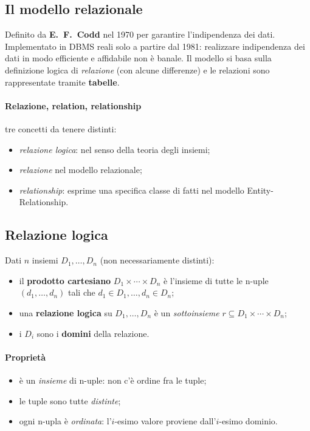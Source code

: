 \documentclass[a4paper,12pt]{article}
\begin{document}
\subsection{Il modello relazionale}

Definito da \textbf{E.\ F.\ Codd} nel 1970 per garantire l'indipendenza dei
dati. Implementato in DBMS reali solo a partire dal 1981: realizzare
indipendenza dei dati in modo efficiente e affidabile non è banale. Il modello
si basa sulla definizione logica di \emph{relazione} (con alcune differenze) e
le relazioni sono rappresentate tramite \textbf{tabelle}.

\paragraph{Relazione, relation, relationship} tre concetti da tenere distinti:
\begin{itemize}
  \item \emph{relazione logica}: nel senso della teoria degli insiemi;
  \item \emph{relazione} nel modello relazionale;
  \item \emph{relationship}: esprime una specifica classe di fatti nel modello
    Entity-Relationship.
\end{itemize}

\subsection{Relazione logica}

Dati $n$ insiemi $D_1, \ldots, D_n$ (non necessariamente distinti):
\begin{itemize}
  \item il \textbf{prodotto cartesiano} $D_1 \times \cdots \times D_n$ è
    l'insieme di tutte le n-uple $(d_1, \ldots, d_n)$ tali che $d_1 \in D_1,
    \ldots, d_n \in D_n$;
  \item una \textbf{relazione logica} su $D_1, \ldots, D_n$ è un
    \emph{sottoinsieme} $r \subseteq D_1 \times \cdots \times D_n$;
  \item i $D_i$ sono i \textbf{domini} della relazione.
\end{itemize}

\paragraph{Proprietà}
\begin{itemize}
  \item è un \emph{insieme} di n-uple: non c'è ordine fra le tuple;
  \item le tuple sono tutte \emph{distinte};
  \item ogni n-upla è \emph{ordinata}: l'$i$-esimo valore proviene
    dall'$i$-esimo dominio.
\end{itemize}
\end{document}
